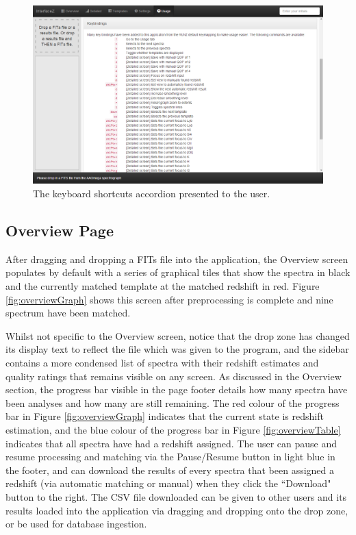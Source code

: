 \documentclass[titlesmallcaps, examinerscopy, copyrightpage]{uqthesis}
\begin{document}
\begin{figure}[ht!]
\includegraphics[width=1\textwidth]{images/keybindings.png} 
\centering
\caption{The keyboard shortcuts accordion presented to the user.}
\label{fig:keyboard}
\end{figure}


\pagebreak
\subsection{Overview Page}

After dragging and dropping a FITs file into the application, the Overview screen populates by default with a series of graphical tiles that show the spectra in black and the currently matched template at the matched redshift in red. Figure \ref{fig:overviewGraph} shows this screen after preprocessing is complete and nine spectrum have been matched.

Whilst not specific to the Overview screen, notice that the drop zone has changed its display text to reflect the file which was given to the program, and the sidebar contains a more condensed list of spectra with their redshift estimates and quality ratings that remains visible on any screen. As discussed in the Overview section, the progress bar visible in the page footer details how many spectra have been analyses and how many are still remaining. The red colour of the progress bar in Figure \ref{fig:overviewGraph} indicates that the current state is redshift estimation, and the blue colour of the progress bar in Figure \ref{fig:overviewTable} indicates that all spectra have had a redshift assigned. The user can pause and resume processing and matching via the Pause/Resume button in light blue in the footer, and can download the results of every spectra that been assigned a redshift (via automatic matching or manual) when they click the ``Download" button to the right. The CSV file downloaded can be given to other users and its results loaded into the application via dragging and dropping onto the drop zone, or be used for database ingestion.
\end{document}
